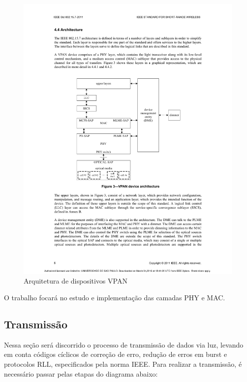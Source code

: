 	\begin{figure}[htb]
		\caption{\label{fig_architecture} Arquitetura de dispositivos VPAN}
		\centering
		\includegraphics[width=0.5\textheight,trim={5.5cm 9.6cm 5.3cm 7cm}, clip]{pag31.pdf}
	\end{figure}
	
	O trabalho focará no estudo e implementação das camadas PHY e MAC.
	

	\subsection{Transmissão}
	
	Nessa seção será discorrido o processo de transmissão de dados via luz, levando em conta códigos cíclicos de correção de erro, redução de erros em burst e protocolos RLL, especificados pela norma IEEE. Para realizar a transmissão, é necessário passar pelas etapas do diagrama abaixo:
		
